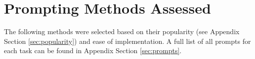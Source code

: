 \documentclass[11pt]{article}
\begin{document}

\section*{Prompting Methods Assessed}

The following methods were selected based on their popularity (see Appendix Section \ref{sec:popularity}) and ease of implementation. A full list of all prompts for each task can be found in Appendix Section \ref{sec:prompts}.
\end{document}
